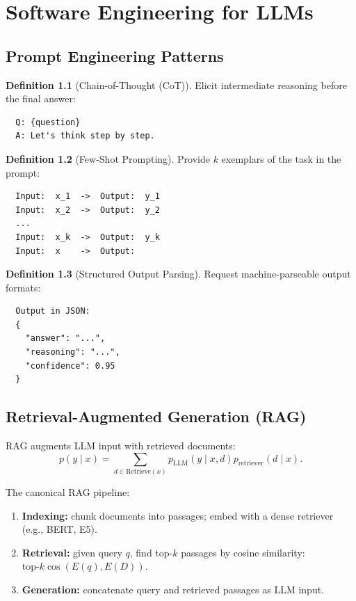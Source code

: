\documentclass[11pt,a4paper]{book}
\theoremstyle{definition}
\newtheorem{definition}{Definition}[chapter]
\begin{document}
\chapter{Software Engineering for LLMs}
\label{ch:se}

\section{Prompt Engineering Patterns}

\begin{definition}[Chain-of-Thought (CoT)]
	Elicit intermediate reasoning before the final answer:
	\begin{lstlisting}
  Q: {question}
  A: Let's think step by step.
  \end{lstlisting}
\end{definition}

\begin{definition}[Few-Shot Prompting]
	Provide $k$ exemplars of the task in the prompt:
	\begin{lstlisting}
  Input:  x_1  ->  Output:  y_1
  Input:  x_2  ->  Output:  y_2
  ...
  Input:  x_k  ->  Output:  y_k
  Input:  x    ->  Output:
  \end{lstlisting}
\end{definition}

\begin{definition}[Structured Output Parsing]
	Request machine-parseable output formats:
	\begin{lstlisting}
  Output in JSON:
  {
    "answer": "...",
    "reasoning": "...",
    "confidence": 0.95
  }
  \end{lstlisting}
\end{definition}

\section{Retrieval-Augmented Generation (RAG)}

RAG augments LLM input with retrieved documents:
\begin{equation}
	p(y \mid x) = \sum_{d \in \text{Retrieve}(x)} p_{\text{LLM}}(y \mid x, d) p_{\text{retriever}}(d \mid x).
\end{equation}

The canonical RAG pipeline:
\begin{enumerate}
	\item \textbf{Indexing:} chunk documents into passages; embed with a dense retriever (e.g., BERT, E5).
	\item \textbf{Retrieval:} given query $q$, find top-$k$ passages by cosine similarity: $\text{top-}k \cos(E(q), E(D))$.
	\item \textbf{Generation:} concatenate query and retrieved passages as LLM input.
\end{enumerate}
\end{document}
